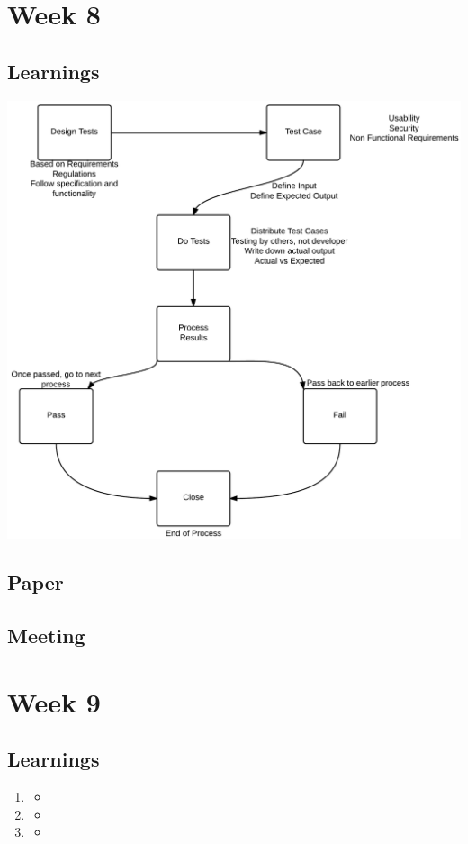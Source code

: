 \chapter{Week 8}

\section{Learnings}
\begin{center}
\includegraphics[scale=0.3]{testing.png}
\end{center}


\section{Paper}

\section{Meeting}
\chapter{Week 9}

\section{Learnings}
\begin{enumerate}
\item
\begin{itemize}
\item
\end{itemize}
\item
\begin{itemize}
\item
\end{itemize}
\item
\begin{itemize}
\item
\end{itemize}
\end{enumerate}

